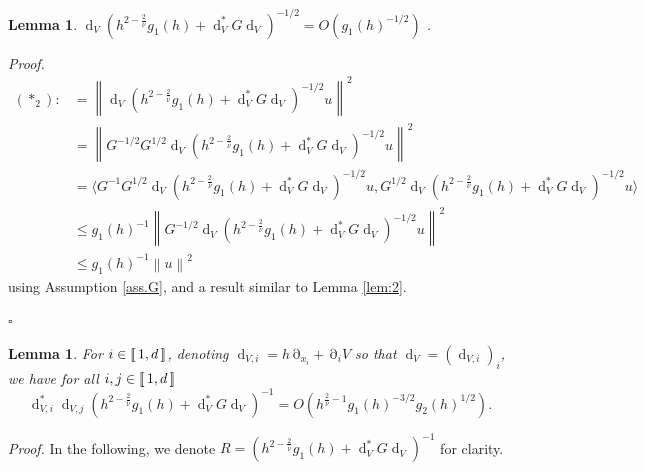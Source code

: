 \documentclass[12pt]{amsart}
\def\<{\langle}
\def\>{\rangle}
\newcommand{\bp}{{\it Proof. }}
\newcommand{\ep}{\hfill $\square$}
\renewcommand{\d}{\operatorname{d}}
\numberwithin{equation}{section}
\numberwithin{figure}{section}
\DeclareMathOperator{\p}{\partial}
\newcommand{\vvert}[1]{\left\lVert#1\right\rVert}
\newcommand{\lb}{\operatorname{[\negthinspace [}}
\newcommand{\rb}{\operatorname{]\negthinspace ]}}
\newtheorem{lemma}[defin]{Lemma}
\begin{document}
\begin{lemma}\label{lem:3}
    $\d_V(h^{2-\frac2{\overline{\nu}}}g_1(h) + \d_V^*G\d_V)^{-1/2} = O(g_1(h)^{-1/2})$%
.
\end{lemma}
\bp
\begin{equation*}
\begin{split}
    (\ast_2) :&= \vvert{\d_V(h^{2-\frac2{\overline{\nu}}}g_1(h) + \d_V^*G\d_V)^{-1/2}u}^2\\
    &= \vvert{G^{-1/2}G^{1/2}\d_V(h^{2-\frac2{\overline{\nu}}}g_1(h) + \d_V^*G\d_V)^{-1/2}u}^2\\
    &= \<G^{-1}G^{1/2}\d_V(h^{2-\frac2{\overline{\nu}}}g_1(h) + \d_V^*G\d_V)^{-1/2}u,G^{1/2}\d_V(h^{2-\frac2{\overline{\nu}}}g_1(h) + \d_V^*G\d_V)^{-1/2}u\>\\
    &\leq g_1(h)^{-1}\vvert{G^{-1/2}\d_V(h^{2-\frac2{\overline{\nu}}}g_1(h) + \d_V^*G\d_V)^{-1/2}u}^2\\
    &\leq g_1(h)^{-1}\vvert{u}^2
\end{split}
\end{equation*}
using %
Assumption \ref{ass.G}, and a result similar to Lemma \ref{lem:2}.

\ep

\begin{lemma}\label{lem:4}
    For $i\in\lb1,d\rb$, denoting $\d_{V,i} = h\p_{x_i} + \p_iV$ so that $\d_V = (\d_{V,i})_i$, we have for all $i,j\in\lb1,d\rb$
    \begin{equation*}
    \d_{V,i}^*\d_{V,j}(h^{2-\frac2{\overline{\nu}}}g_1(h) + \d_V^*G\d_V)^{-1} = O(h^{\frac{2}{\overline{\nu}} - 1}g_1(h)^{-3/2}g_2(h)^{1/2}).
    \end{equation*}
\end{lemma}
\bp
In the following, we denote $R = (h^{2-\frac2{\overline{\nu}}}g_1(h) + \d_V^*G\d_V)^{-1}$ for clarity.
\end{document}
